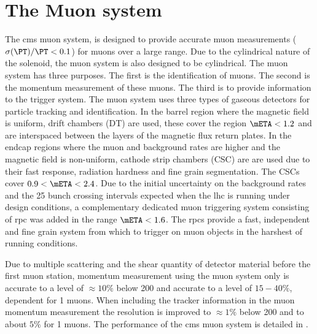 \section{The  Muon system} %
\label{sec:the_cms_muon_system}
The \ac{cms} muon system, is designed to provide accurate muon \PT measurements
($\sigma(\PT)/\PT < 0.1$) for muons over a large \PT range. Due to the
cylindrical nature of the solenoid, the muon system is also designed to be
cylindrical. The muon system has three purposes. The first is the identification
of muons. The second is the momentum measurement of these muons. The third is to
provide information to the trigger system.
The muon system uses three types of gaseous detectors for particle tracking and
identification. In the barrel region where the magnetic field is uniform, drift
chambers (DT) are used, these cover the region $\mETA < 1.2$ and are
interspaced between the layers of the magnetic flux return plates. In the 
endcap regions where the muon and background rates are higher and the magnetic
field is non-uniform, cathode strip chambers (CSC) are are used due to their
fast response, radiation hardness and fine grain segmentation. The CSCs cover
$0.9 < \mETA < 2.4$. Due to the initial uncertainty on the background rates and
the \unit{25}{\nano\second} bunch crossing intervals expected when the \ac{lhc}
is running under design conditions, a complementary dedicated muon triggering
system consisting of \ac{rpc} was added in the range $\mETA < 1.6$. The
\ac{rpc}s provide a fast, independent and fine grain system from
which to trigger on muon objects in the harshest of running conditions.

Due to multiple scattering and the shear quantity of detector material before
the first muon station, momentum measurement using the muon system only is
accurate to a level of $\approx10\%$ below \unit{200}{\GeV} and accurate to a
level of $15-40\%$, \mETA dependent  for \unit{1}{\TeV} muons. When including
the tracker information in the muon momentum measurement the resolution is
improved to $\approx1\%$ below \unit{200}{\GeV} and to about $5\%$ for
\unit{1}{\TeV} muons. The performance of the \ac{cms} muon system is detailed
in .

